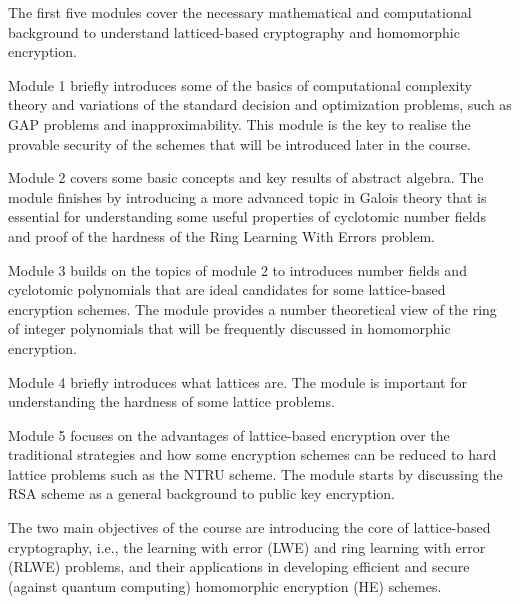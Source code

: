 \documentclass[../main.tex]{subfiles}
\begin{document}
The first five modules cover the necessary mathematical and computational background to understand latticed-based cryptography and homomorphic encryption. 

Module 1 briefly introduces some of the basics of computational complexity theory and variations of the standard decision and optimization problems, such as GAP problems and inapproximability. This module is the key to realise the provable security of the schemes that will be introduced later in the course.

Module 2 covers some basic concepts and key results of abstract algebra. The module finishes by introducing a more advanced topic in Galois theory that is essential for understanding some useful properties of cyclotomic number fields and proof of the hardness of the Ring Learning With Errors problem. 

Module 3 builds on the topics of module 2 to introduces number fields and cyclotomic polynomials that are ideal candidates for some lattice-based encryption schemes. The module provides a number theoretical view of the ring of integer polynomials that will be frequently discussed in homomorphic encryption. 

Module 4 briefly introduces what lattices are. The module is important for understanding the hardness of some lattice problems.  

Module 5 focuses on the advantages of lattice-based encryption over the traditional strategies and how some encryption schemes can be reduced to hard lattice problems such as the NTRU scheme. The module starts by discussing the RSA scheme as a general background to public key encryption. 

The two main objectives of the course are introducing the core of lattice-based cryptography, i.e., the learning with error (LWE) and ring learning with error (RLWE) problems, and their applications in developing efficient and secure (against quantum computing) homomorphic encryption (HE) schemes. 
\end{document}

